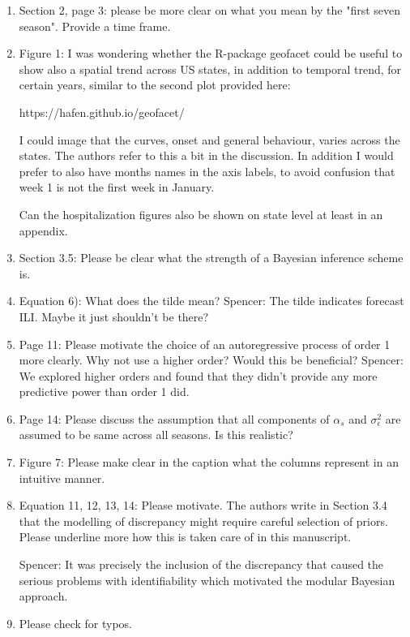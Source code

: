 \documentclass{article}
\newcommand{\spencer}[1]{{\color{green} Spencer: #1}}
\begin{document}
\begin{enumerate}[-]

\item Section 2, page 3: please be more clear on what you mean by the 
"first seven season". Provide a time frame.

\item Figure 1: I was wondering whether the R-package geofacet could be useful to 
show also a spatial trend across US states, in addition to temporal trend, for 
certain years,  similar to the second plot provided here:

https://hafen.github.io/geofacet/

I could image that the curves, onset and general behaviour, varies across the 
states. The authors refer to this a bit in the discussion. In addition I would 
prefer to also have months names in the axis labels, to avoid confusion that 
week 1 is not the first week in January.

Can the hospitalization figures also be shown on state level at least in an appendix.

\item Section 3.5: Please be clear what the strength of a Bayesian inference scheme is. 

\item Equation 6): What does the tilde mean?
\spencer{The tilde indicates forecast ILI. Maybe it just shouldn't be there?}

\item Page 11: Please motivate the choice of an autoregressive process of order 1 
more clearly. Why not use a higher order? Would this be beneficial?
\spencer{We explored higher orders and found that they didn't provide any more
predictive power than order 1 did.}

\item Page 14: Please discuss the assumption that all components of $\alpha_s$ and 
$\sigma_\epsilon^2$ are assumed to be same across all seasons. Is this realistic?

\item Figure 7: Please make clear in the caption what the columns represent in an 
intuitive manner. 

\item Equation 11, 12, 13, 14: Please motivate. The authors write in Section 3.4 
that the modelling of discrepancy might require careful selection of priors. 
Please underline more how this is taken care of in this manuscript.

\spencer{It was precisely the inclusion of the discrepancy that caused the serious problems
with identifiability which motivated the modular Bayesian approach. }

\item Please check for typos.
  
\end{enumerate}
\end{document}
